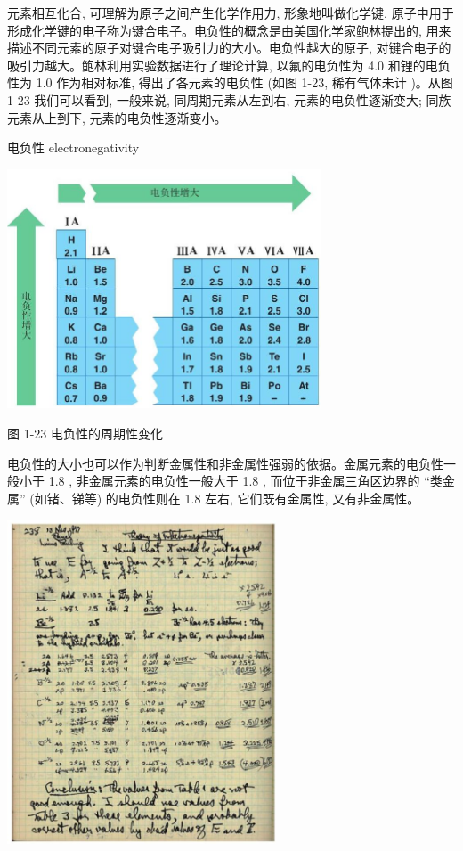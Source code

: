 \documentclass[10pt]{article}
\begin{document}
元素相互化合, 可理解为原子之间产生化学作用力, 形象地叫做化学键, 原子中用于形成化学键的电子称为键合电子。电负性的概念是由美国化学家鲍林提出的, 用来描述不同元素的原子对键合电子吸引力的大小。电负性越大的原子, 对键合电子的吸引力越大。鲍林利用实验数据进行了理论计算, 以氟的电负性为 4.0 和锂的电负性为 1.0 作为相对标准, 得出了各元素的电负性 (如图 1-23, 稀有气体未计 )。从图 1-23 我们可以看到, 一般来说, 同周期元素从左到右, 元素的电负性逐渐变大; 同族元素从上到下, 元素的电负性逐渐变小。

\begin{mdframed}

电负性 electronegativity

\end{mdframed}

\begin{center}
\includegraphics[max width=0.7\textwidth]{images/0190e026-5a11-7df7-bd27-54d09026ba7a_28_476213.jpg}
\end{center}

图 1-23 电负性的周期性变化

电负性的大小也可以作为判断金属性和非金属性强弱的依据。金属元素的电负性一般小于 1.8 , 非金属元素的电负性一般大于 1.8 , 而位于非金属三角区边界的 “类金属” (如锗、锑等) 的电负性则在 1.8 左右, 它们既有金属性, 又有非金属性。

\begin{center}
\includegraphics[max width=0.6\textwidth]{images/0190e026-5a11-7df7-bd27-54d09026ba7a_28_821065.jpg}
\end{center}
\end{document}
